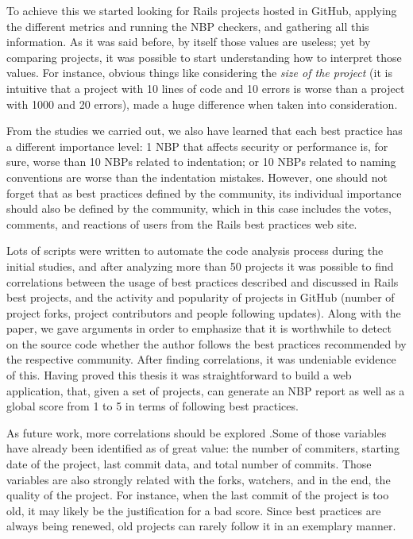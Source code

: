 To achieve this we started looking for Rails projects hosted in GitHub, 
applying the different metrics and running the NBP checkers, and gathering all this information.
As it was said before, by itself those values are useless; yet
by comparing projects, it was possible to start understanding how to interpret those values.
For instance, obvious things like considering the \emph{size of the project}
(it is intuitive that a project with 10 lines of code and 10 errors is worse than a project with 1000 and 20 errors),
made a huge difference when taken into consideration.

From the studies we carried out,
we also have learned that each best practice has a different importance level:
1 NBP that affects security or performance is, for sure, worse than 10 NBPs related to indentation;
or 10 NBPs related to naming conventions are worse than the indentation mistakes.
However, one should not forget that as best practices defined by the community, 
its individual importance should also be defined by the community, which 
in this case includes the votes, comments, and reactions of users from the Rails best practices web site.

Lots of scripts were written to automate the code analysis process during the initial studies, 
and after analyzing more than 50 projects it was possible to find correlations
between the usage of best practices described and discussed in Rails best projects, and
the activity and popularity of projects in GitHub (number of project forks, project contributors and people following updates).
Along with the paper, we gave arguments in order to emphasize that it is worthwhile to detect on the source code
whether the author follows the best practices recommended by the respective community.
After finding correlations, it was undeniable evidence of this.
Having proved this thesis it was straightforward to build a web application, that, 
given a set of projects, can generate an NBP report as well as a global score from 1 to 5 in terms of following best practices.

As future work, more correlations should be explored
.Some of those variables have already been identified as of great value: the number of commiters, starting date of the project, last commit data, and total number of commits. 
Those variables are also strongly related with the forks, watchers, and in the end, the quality of the project.
For instance, when the last commit of the project is too old, it may likely be the justification for a bad score. 
Since best practices are always being renewed, old projects can rarely follow it in an exemplary manner.

